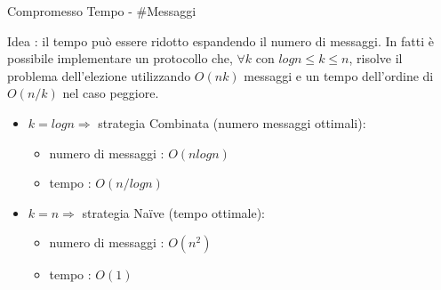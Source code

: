 
\begin{frame}{Compromesso Tempo - \#Messaggi}

Idea : il tempo può essere ridotto espandendo il numero di messaggi. In fatti è possibile implementare un protocollo che, $\forall k$ con $logn\leq k \leq n$, risolve il problema dell'elezione utilizzando $O(nk)$ messaggi e un tempo dell'ordine di $O(n/k)$ nel caso peggiore.
\begin{itemize}
\item $k=logn \Rightarrow$ strategia Combinata (numero messaggi ottimali): 
\begin{itemize}
\item numero di messaggi : $O(nlogn)$
\item tempo : $O(n/logn)$
\end{itemize} 

\item $k=n \Rightarrow$ strategia Na{\"i}ve (tempo ottimale): 
\begin{itemize}
\item numero di messaggi : $O(n^2)$
\item tempo : $O(1)$
\end{itemize} 

\end{itemize} 

\end{frame}
